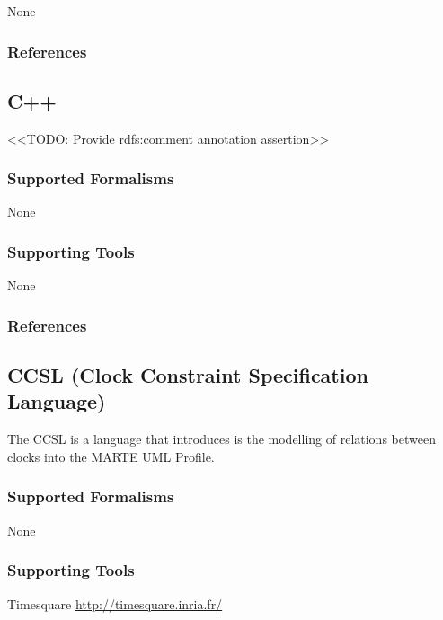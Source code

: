 None


\subsubsection{References}





\subsection{C++}
\label{subsecL:C++}

<<TODO: Provide rdfs:comment annotation assertion>>

\subsubsection{Supported Formalisms}

None


\subsubsection{Supporting Tools}

None


\subsubsection{References}





\subsection{CCSL (Clock Constraint Specification Language)}
\label{subsecL:CCSL}

The CCSL is a language that introduces is the modelling of relations between clocks into the MARTE UML Profile.

\subsubsection{Supported Formalisms}

None


\subsubsection{Supporting Tools}

Timesquare \url{http://timesquare.inria.fr/}



